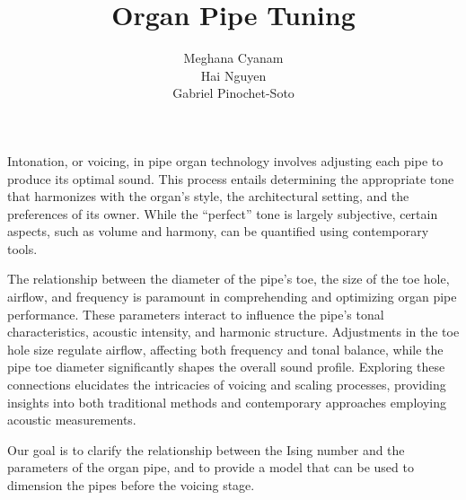 \documentclass{psu-report}
\title{Organ Pipe Tuning}
\author{
    Meghana Cyanam \\
    Hai Nguyen \\
    Gabriel Pinochet-Soto \\
}
\begin{document}
\maketitle
\makecopyright

\begin{psuabstract}
    Intonation, or voicing, in pipe organ technology involves adjusting each
    pipe to produce its optimal sound.
    This process entails determining the appropriate tone that harmonizes with
    the organ’s style, the architectural setting, and the preferences of its
    owner.
    While the “perfect” tone is largely subjective, certain aspects, such as 
    volume and harmony, can be quantified using contemporary tools.
    
    The relationship between the diameter of the pipe’s toe, the size of the toe
    hole, airflow, and frequency is paramount in comprehending and optimizing
    organ pipe performance.
    These parameters interact to influence the pipe’s tonal characteristics,
    acoustic intensity, and harmonic structure. Adjustments in the toe hole size
    regulate airflow, affecting both frequency and tonal balance, while the pipe
    toe diameter significantly shapes the overall sound profile.
    Exploring these connections elucidates the intricacies of voicing and 
    scaling processes, providing insights into both traditional methods and
    contemporary approaches employing acoustic measurements.

    Our goal is to clarify the relationship between the Ising number and the
    parameters of the organ pipe, and to provide a model that can be used to
    dimension the pipes before the voicing stage.

\end{psuabstract}
\end{document}
